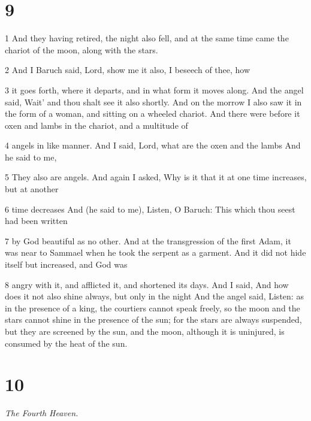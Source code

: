\chapter{9}

\par 1 And they having retired, the night also fell, and at the same time came the chariot of the moon, along with the stars.

\par 2 And I Baruch said, Lord, show me it also, I beseech of thee, how

\par 3 it goes forth, where it departs, and in what form it moves along. And the angel said, Wait' and thou shalt see it also shortly. And on the morrow I also saw it in the form of a woman, and sitting on a wheeled chariot. And there were before it oxen and lambs in the chariot, and a multitude of

\par 4 angels in like manner. And I said, Lord, what are the oxen and the lambs And he said to me,

\par 5 They also are angels. And again I asked, Why is it that it at one time increases, but at another

\par 6 time decreases And (he said to me), Listen, O Baruch: This which thou seest had been written

\par 7 by God beautiful as no other. And at the transgression of the first Adam, it was near to Sammael when he took the serpent as a garment. And it did not hide itself but increased, and God was

\par 8 angry with it, and afflicted it, and shortened its days. And I said, And how does it not also shine always, but only in the night And the angel said, Listen: as in the presence of a king, the courtiers cannot speak freely, so the moon and the stars cannot shine in the presence of the sun; for the stars are always suspended, but they are screened by the sun, and the moon, although it is uninjured, is consumed by the heat of the sun.

\chapter{10}

\par \textit{The Fourth Heaven.}

